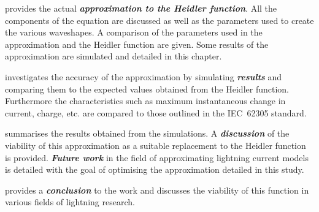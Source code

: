  provides the actual \textbf{\textit{approximation to the Heidler function}}. All the components of the equation are discussed as well as the parameters used to create the various waveshapes. A comparison of the parameters used in the approximation and the Heidler function are given. Some results of the approximation are simulated and detailed in this chapter.

 investigates the accuracy of the approximation by simulating \textbf{\textit{results}} and comparing them to the expected values obtained from the Heidler function. Furthermore the characteristics such as maximum instantaneous change in current, charge, etc. are compared to those outlined in the IEC~62305 standard.

 summarises the results obtained from the simulations. A \textbf{\textit{discussion}} of the viability of this approximation as a suitable replacement to the Heidler function is provided. \textbf{\textit{Future work}} in the field of approximating lightning current models is detailed with the goal of optimising the approximation detailed in this study.

 provides a \textbf{\textit{conclusion}} to the work and discusses the viability of this function in various fields of lightning research.

